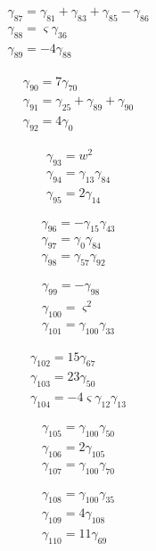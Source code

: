 \[\begin{aligned}\gamma_{87}=\gamma_{81} + \gamma_{83} + \gamma_{85} - \gamma_{86}\\ \gamma_{88}=\varsigma  \gamma_{36}\\ \gamma_{89}=- 4 \gamma_{88}\end{aligned}\]

\[\begin{aligned}\gamma_{90}=7 \gamma_{70}\\ \gamma_{91}=\gamma_{25} + \gamma_{89} + \gamma_{90}\\ \gamma_{92}=4 \gamma_{0}\end{aligned}\]

\[\begin{aligned}\gamma_{93}=w^{2}\\ \gamma_{94}=\gamma_{13} \gamma_{84}\\ \gamma_{95}=2 \gamma_{14}\end{aligned}\]

\[\begin{aligned}\gamma_{96}=- \gamma_{15} \gamma_{43}\\ \gamma_{97}=\gamma_{0} \gamma_{84}\\ \gamma_{98}=\gamma_{57} \gamma_{92}\end{aligned}\]

\[\begin{aligned}\gamma_{99}=- \gamma_{98}\\ \gamma_{100}=\varsigma ^{2}\\ \gamma_{101}=\gamma_{100} \gamma_{33}\end{aligned}\]

\[\begin{aligned}\gamma_{102}=15 \gamma_{67}\\ \gamma_{103}=23 \gamma_{50}\\ \gamma_{104}=- 4 \varsigma  \gamma_{12} \gamma_{13}\end{aligned}\]

\[\begin{aligned}\gamma_{105}=\gamma_{100} \gamma_{50}\\ \gamma_{106}=2 \gamma_{105}\\ \gamma_{107}=\gamma_{100} \gamma_{70}\end{aligned}\]

\[\begin{aligned}\gamma_{108}=\gamma_{100} \gamma_{35}\\ \gamma_{109}=4 \gamma_{108}\\ \gamma_{110}=11 \gamma_{69}\end{aligned}\]

